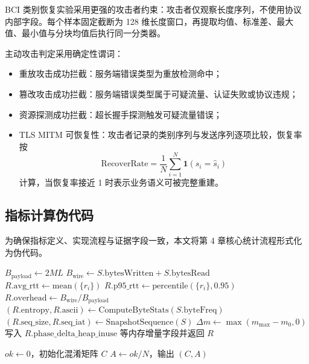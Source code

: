 BCI 类别恢复实验采用更强的攻击者约束：攻击者仅观察长度序列，不使用协议内部字段。每个样本固定截断为 128 维长度窗口，再提取均值、标准差、最大值、最小值与分块均值后执行同一分类器。

主动攻击判定采用确定性谓词：
\begin{itemize}
  \item 重放攻击成功拦截：服务端错误类型为重放检测命中；
  \item 篡改攻击成功拦截：服务端错误类型属于可疑流量、认证失败或协议违规；
  \item 资源探测成功拦截：超长握手探测触发可疑流量错误；
  \item TLS MITM 可恢复性：攻击者记录的类别序列与发送序列逐项比较，恢复率按
\[
\mathrm{RecoverRate}=\frac{1}{N}\sum_{i=1}^{N}\mathbf{1}(s_i=\hat{s}_i)
\]
计算，当恢复率接近 1 时表示业务语义可被完整重建。
\end{itemize}

\subsection{指标计算伪代码}
为确保指标定义、实现流程与证据字段一致，本文将第 4 章核心统计流程形式化为伪代码。

\begin{algorithm}[H]
\small
\caption{统一指标归并流程（单协议单轮）}
\label{alg:c4-metric-pipeline}
$B_{\mathrm{payload}} \leftarrow 2ML$\;
$B_{\mathrm{wire}} \leftarrow S.\mathrm{bytesWritten}+S.\mathrm{bytesRead}$\;
$R.\mathrm{avg\_rtt} \leftarrow \mathrm{mean}(\{r_i\})$\;
$R.\mathrm{p95\_rtt} \leftarrow \mathrm{percentile}(\{r_i\},0.95)$\;
$R.\mathrm{overhead} \leftarrow B_{\mathrm{wire}}/B_{\mathrm{payload}}$\;
$(R.\mathrm{entropy},R.\mathrm{ascii}) \leftarrow \mathrm{ComputeByteStats}(S.\mathrm{byteFreq})$\;
$(R.\mathrm{seq\_size},R.\mathrm{seq\_iat}) \leftarrow \mathrm{SnapshotSequence}(S)$\;
$\Delta m \leftarrow \max(m_{\max}-m_0,0)$\;
写入 $R.\mathrm{phase\_delta\_heap\_inuse}$ 等内存增量字段并返回 $R$\;
\end{algorithm}

\begin{algorithm}[H]
\small
\caption{留一法最近质心侧写分类}
\label{alg:c4-loo-centroid}
$ok \leftarrow 0$，初始化混淆矩阵 $C$\;
$A \leftarrow ok/N$，输出 $(C,A)$\;
\end{algorithm}

